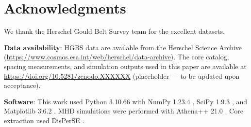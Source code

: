 \documentclass[11pt,a4paper]{article}
\begin{document}
\section*{Acknowledgments}

We thank the Herschel Gould Belt Survey team for the excellent datasets.

\textbf{Data availability}: HGBS data are available from the Herschel Science Archive (\url{https://www.cosmos.esa.int/web/herschel/data-archive}). The core catalog, spacing measurements, and simulation outputs used in this paper are available at \url{https://doi.org/10.5281/zenodo.XXXXXX} (placeholder — to be updated upon acceptance).

\textbf{Software}: This work used Python 3.10.66 \citep{Python2023} with NumPy 1.23.4 \citep{Harris2020}, SciPy 1.9.3 \citep{Virtanen2020}, and Matplotlib 3.6.2 \citep{Hunter2007}. MHD simulations were performed with Athena++ 21.0 \citep{Stone2020}. Core extraction used DisPerSE \citep{Sousbie2011}.



\end{document}
